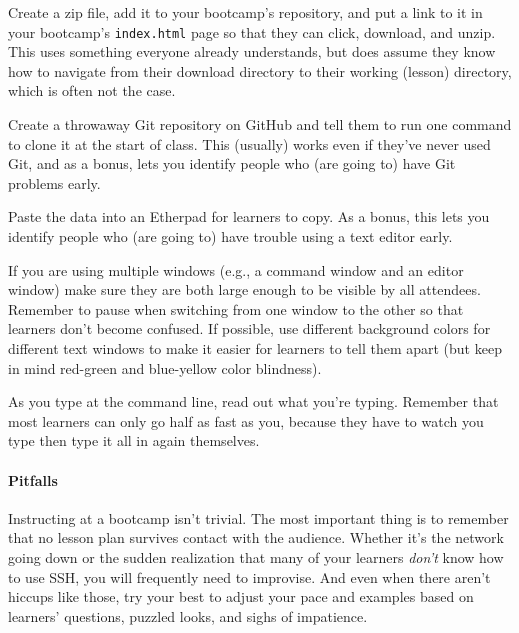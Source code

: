 \documentclass{book}
\begin{document}
\begin{swcitemize}
  \begin{swcenumerate2}
  \item
    Create a zip file, add it to your bootcamp's repository, and put a
    link to it in your bootcamp's \texttt{index.html} page so that they
    can click, download, and unzip. This uses something everyone already
    understands, but does assume they know how to navigate from their
    download directory to their working (lesson) directory, which is
    often not the case.
  \item
    Create a throwaway Git repository on GitHub and tell them to run one
    command to clone it at the start of class. This (usually) works even
    if they've never used Git, and as a bonus, lets you identify people
    who (are going to) have Git problems early.
  \item
    Paste the data into an Etherpad for learners to copy. As a bonus,
    this lets you identify people who (are going to) have trouble using
    a text editor early.
  \end{swcenumerate2}
\item
  If you are using multiple windows (e.g., a command window and an
  editor window) make sure they are both large enough to be visible by
  all attendees. Remember to pause when switching from one window to the
  other so that learners don't become confused. If possible, use
  different background colors for different text windows to make it
  easier for learners to tell them apart (but keep in mind red-green and
  blue-yellow color blindness).
\item
  As you type at the command line, read out what you're typing. Remember
  that most learners can only go half as fast as you, because they have
  to watch you type then type it all in again themselves.
\end{swcitemize}

\mbox{}\paragraph{Pitfalls}

Instructing at a bootcamp isn't trivial. The most important thing is to
remember that no lesson plan survives contact with the audience. Whether
it's the network going down or the sudden realization that many of your
learners \emph{don't} know how to use SSH, you will frequently need to
improvise. And even when there aren't hiccups like those, try your best
to adjust your pace and examples based on learners' questions, puzzled
looks, and sighs of impatience.
\end{document}
